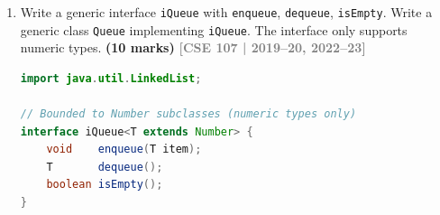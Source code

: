 \documentclass[12pt,a3paper]{article}
\newcommand{\yr}[1]{\hfill\textcolor{gray}{\small\textbf{[#1]}}}
\newcommand{\mk}[1]{\textcolor{orange!70!black}{\small\textbf{(#1 marks)}}}
\begin{document}
\begin{enumerate}
\begin{tcolorbox}
Since one salary is \texttt{null}, \texttt{HashMap} is required
(\texttt{Hashtable} does not allow null values).

\begin{lstlisting}[language=Java]
import java.util.HashMap;
import java.util.Map;

class IPLDemo {
    public static void main(String[] args) {
        HashMap<String, Integer> players = new HashMap<>();
        players.put("Pat Cummins",     17_300_000);
        players.put("Kane Williamson", 16_000_000);
        players.put("MS Dhoni",        null);       // null salary

        // Iterate and print
        System.out.println("--- IPL Salaries ---");
        for (Map.Entry<String, Integer> e : players.entrySet())
            System.out.println(e.getKey() + ": " + e.getValue());

        // Increase Pat Cummins's salary by 500,000
        players.put("Pat Cummins",
                    players.get("Pat Cummins") + 500_000);

        System.out.println("\nAfter raise:");
        System.out.println("Pat Cummins: " + players.get("Pat Cummins"));
    }
}
\end{lstlisting}
\textbf{Output:}
\begin{verbatim}
--- IPL Salaries ---
Pat Cummins: 17300000
Kane Williamson: 16000000
MS Dhoni: null

After raise:
Pat Cummins: 17800000
\end{verbatim}
\end{tcolorbox}


\item Write a generic interface \texttt{iQueue} with \texttt{enqueue}, \texttt{dequeue}, \texttt{isEmpty}. Write a generic class \texttt{Queue} implementing \texttt{iQueue}. The interface only supports numeric types. \mk{10}
\yr{CSE 107 | 2019--20, 2022--23}

\begin{tcolorbox}[enhanced,breakable,ansbox,
  colback=cG!4,colframe=cG,boxrule=0.8pt,arc=5pt,
  title={\textbf{Answer --- Generic iQueue Interface and Queue Class (Numeric Only)}},
  fonttitle=\bfseries\color{white},colbacktitle=cG]
\begin{lstlisting}[language=Java]
import java.util.LinkedList;

// Bounded to Number subclasses (numeric types only)
interface iQueue<T extends Number> {
    void    enqueue(T item);
    T       dequeue();
    boolean isEmpty();
}


\end{lstlisting}
\end{tcolorbox}
\end{enumerate}
\end{document}

